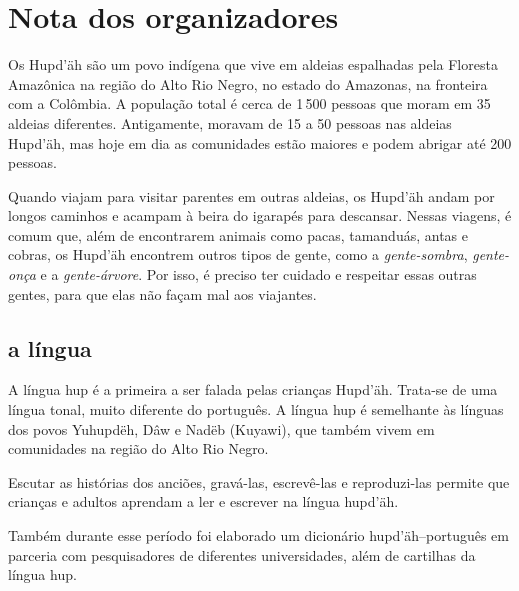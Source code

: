 \chapter{Nota dos organizadores}

Os Hupd’äh são um povo indígena que vive em aldeias espalhadas pela Floresta Amazônica na região do Alto Rio Negro, no estado do Amazonas, na fronteira com a Colômbia. A população total é cerca de 1\,500 pessoas que moram em 35 aldeias diferentes. Antigamente, moravam de 15 a 50 pessoas nas aldeias Hupd’äh, mas hoje em dia as comunidades estão maiores e podem abrigar até 200 pessoas.


Quando viajam para visitar parentes em outras aldeias, os Hupd’äh andam por longos caminhos e acampam à beira do igarapés para descansar. Nessas viagens, é comum que, além de encontrarem animais como pacas, tamanduás, antas e cobras, os Hupd’äh encontrem outros tipos de gente, como a \textit{gente-sombra}, \textit{gente-onça} e a \textit{gente-árvore}. Por isso, é preciso ter cuidado e respeitar essas outras gentes, para que elas não façam mal aos viajantes.

\section{a língua}

A língua hup é a primeira a ser falada pelas crianças Hupd’äh. Trata-se de uma língua tonal, muito
diferente do português. A língua hup é semelhante às línguas dos povos Yuhupdëh,
Dâw e Nadëb (Kuyawi), que também vivem em comunidades na região do Alto Rio Negro.


Escutar as histórias dos anciões, gravá-las, escrevê-las e reproduzi-las permite que
crianças e adultos aprendam a ler e escrever na língua hupd’äh.

Também durante esse período foi elaborado um dicionário hupd’äh--português em parceria
com pesquisadores de diferentes universidades, além de cartilhas da língua hup.
